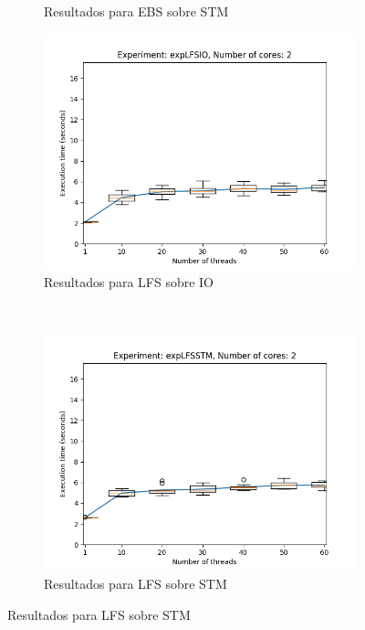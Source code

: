 \begin{figure}[H]
\begin{subfigure}[b]{0.49\textwidth}
        \caption{Resultados para EBS sobre STM}
        \label{subfig:numberOfThreadsDist-ebsstm-2}
    \end{subfigure}
    \begin{subfigure}[b]{0.49\textwidth}
        \includegraphics[width=\textwidth]{images/numberOfThreadsDist/plots/expLFSIO-2}
        \caption{Resultados para LFS sobre IO}
        \label{subfig:numberOfThreadsDist-lfsio-2}
    \end{subfigure}
    ~
    \begin{subfigure}[b]{0.49\textwidth}
        \includegraphics[width=\textwidth]{images/numberOfThreadsDist/plots/expLFSSTM-2}
        \caption{Resultados para LFS sobre STM}
        \label{subfig:numberOfThreadsDist-lfsstm-2}

\end{subfigure}
\end{figure}
